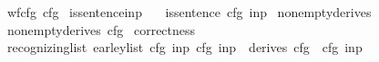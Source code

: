 \begin{isabellebody}
\ \ \ {\isachardoublequoteopen}wf{\isacharunderscore}{\kern0pt}cfg\ cfg{\isachardoublequoteclose}%
\isadelimproof
%
\endisadelimproof
%
\isatagproof
%
\endisatagproof
{\isafoldproof}%
%
\isadelimproof
\isanewline
%
\endisadelimproof
{}\isamarkupfalse%
\ is{\isacharunderscore}{\kern0pt}sentence{\isacharunderscore}{\kern0pt}inp{\isacharcolon}{\kern0pt}\isanewline
\ \ \ {\isachardoublequoteopen}is{\isacharunderscore}{\kern0pt}sentence\ cfg\ inp{\isachardoublequoteclose}%
\isadelimproof
%
\endisadelimproof
%
\isatagproof
%
\endisatagproof
{\isafoldproof}%
%
\isadelimproof
\isanewline
%
\endisadelimproof
{}\isamarkupfalse%
\ nonempty{\isacharunderscore}{\kern0pt}derives{\isacharcolon}{\kern0pt}\isanewline
\ \ \ {\isachardoublequoteopen}nonempty{\isacharunderscore}{\kern0pt}derives\ cfg{\isachardoublequoteclose}%
\isadelimproof
%
\endisadelimproof
%
\isatagproof
%
\endisatagproof
{\isafoldproof}%
%
\isadelimproof
\isanewline
%
\endisadelimproof
{}\isamarkupfalse%
\ correctness{\isacharcolon}{\kern0pt}\isanewline
\ \ \ {\isachardoublequoteopen}recognizing{\isacharunderscore}{\kern0pt}list\ {\isacharparenleft}{\kern0pt}earley{\isacharunderscore}{\kern0pt}list\ cfg\ inp{\isacharparenright}{\kern0pt}\ cfg\ inp\ {\isasymlongleftrightarrow}\ derives\ cfg\ {\isacharbrackleft}{\kern0pt}{\isasymSS}\ cfg{\isacharbrackright}{\kern0pt}\ inp{\isachardoublequoteclose}%
\isadelimproof
%
\endisadelimproof
%
\isatagproof
%
\endisatagproof
{\isafoldproof}%
%
\isadelimproof
%
\endisadelimproof
%
\isadelimtheory
%
\endisadelimtheory
%
\isatagtheory
%
\endisatagtheory
{\isafoldtheory}%
%
\isadelimtheory
%
\endisadelimtheory
%
\end{isabellebody}%
\endinput
